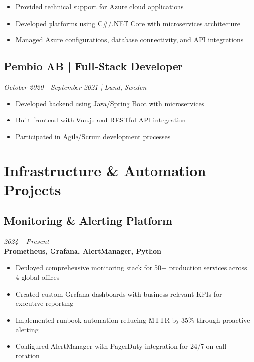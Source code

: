 \documentclass[11pt,a4paper]{article}
\begin{document}
\begin{itemize}[leftmargin=*, itemsep=2pt]
\item Provided technical support for Azure cloud applications
\item Developed platforms using C\#/.NET Core with microservices architecture
\item Managed Azure configurations, database connectivity, and API integrations
\end{itemize}

\subsection*{Pembio AB | Full-Stack Developer}
\textit{October 2020 - September 2021 | Lund, Sweden}

\begin{itemize}[leftmargin=*, itemsep=2pt]
\item Developed backend using Java/Spring Boot with microservices
\item Built frontend with Vue.js and RESTful API integration
\item Participated in Agile/Scrum development processes
\end{itemize}

\section*{Infrastructure \& Automation Projects}

\subsection*{Monitoring \& Alerting Platform}
\textit{2024 -- Present} \\
\textbf{Prometheus, Grafana, AlertManager, Python}
\begin{itemize}[leftmargin=*, itemsep=2pt]
\item Deployed comprehensive monitoring stack for 50+ production services across 4 global offices
\item Created custom Grafana dashboards with business-relevant KPIs for executive reporting
\item Implemented runbook automation reducing MTTR by 35\% through proactive alerting
\item Configured AlertManager with PagerDuty integration for 24/7 on-call rotation
\end{itemize}
\end{document}
